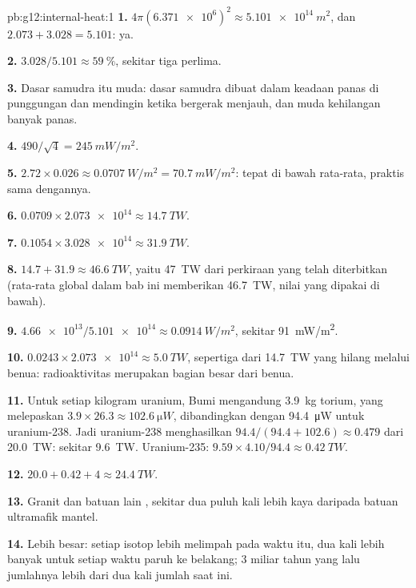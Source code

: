\begin{solution}{pb:g12:internal-heat:1}
\textbf{1.} $4\pi (\num{6.371e6})^2 \approx \qty{5.101e14}{m^2}$, dan
$2.073 + 3.028 = 5.101$: ya.

\textbf{2.} $3.028/5.101 \approx \qty{59}{\percent}$, sekitar tiga perlima.

\textbf{3.} Dasar samudra itu muda: dasar samudra dibuat dalam keadaan panas
di punggungan dan mendingin ketika bergerak menjauh, dan  muda
kehilangan banyak panas.

\textbf{4.} $490/\sqrt{4} = \qty{245}{mW/m^2}$.

\textbf{5.} $2.72 \times 0.026 \approx \qty{0.0707}{W/m^2} =
\qty{70.7}{mW/m^2}$: tepat di bawah rata-rata, praktis sama dengannya.

\textbf{6.} $0.0709 \times \num{2.073e14} \approx \qty{14.7}{TW}$.

\textbf{7.} $0.1054 \times \num{3.028e14} \approx \qty{31.9}{TW}$.

\textbf{8.} $14.7 + 31.9 \approx \qty{46.6}{TW}$, yaitu \qty{47}{TW} dari
perkiraan yang telah diterbitkan (rata-rata global dalam bab ini memberikan
\qty{46.7}{TW}, nilai yang dipakai di bawah).

\textbf{9.} $\num{4.66e13}/\num{5.101e14} \approx \qty{0.0914}{W/m^2}$,
sekitar \qty{91}{mW/m^2}.

\textbf{10.} $0.0243 \times \num{2.073e14} \approx \qty{5.0}{TW}$, sepertiga
dari \qty{14.7}{TW} yang hilang melalui benua: radioaktivitas 
merupakan bagian besar dari  benua.

\textbf{11.} Untuk setiap kilogram uranium, Bumi mengandung \qty{3.9}{kg}
torium, yang melepaskan $3.9 \times 26.3 \approx \qty{102.6}{\micro W}$,
dibandingkan dengan \qty{94.4}{\micro W} untuk uranium-238. Jadi uranium-238
menghasilkan $94.4/(94.4 + 102.6) \approx 0.479$ dari \qty{20.0}{TW}: sekitar
\qty{9.6}{TW}. Uranium-235: $9.59 \times 4.10/94.4 \approx \qty{0.42}{TW}$.

\textbf{12.} $20.0 + 0.42 + 4 \approx \qty{24.4}{TW}$.

\textbf{13.} Granit dan batuan lain , sekitar dua puluh kali lebih
kaya daripada batuan ultramafik mantel.

\textbf{14.} Lebih besar: setiap isotop lebih melimpah pada waktu itu, dua kali
lebih banyak untuk setiap waktu paruh ke belakang; 3 miliar tahun yang lalu
jumlahnya lebih dari dua kali jumlah saat ini.


\end{solution}
